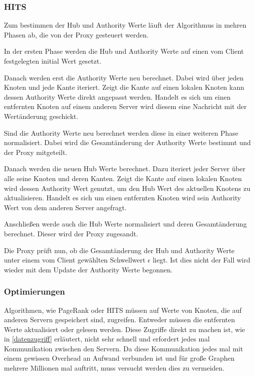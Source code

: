 \subsubsection{HITS}

Zum bestimmen der Hub und Authority Werte läuft der Algorithmus in mehren Phasen ab, die von der Proxy gesteuert werden.

In der ersten Phase werden die Hub und Authority Werte auf einen vom Client festgelegten initial Wert gesetzt.

Danach werden erst die Authority Werte neu berechnet. Dabei wird über jeden Knoten und jede Kante iteriert. Zeigt die Kante auf einen lokalen Knoten kann dessen Authority Werte direkt angepasst werden. Handelt es sich um einen entfernten Knoten auf einem anderen Server
wird diesem eine Nachricht mit der Wertänderung geschickt.

Sind die Authority Werte neu berechnet werden diese in einer weiteren Phase normalisiert. Dabei wird die Gesamtänderung der Authority Werte bestimmt und der Proxy mitgeteilt.

Danach werden die neuen Hub Werte berechnet. Dazu iteriert jeder Server über alle seine Knoten und deren Kanten. Zeigt die Kante auf einen lokalen Knoten wird dessen Authority Wert genutzt, um den Hub Wert des aktuellen Knotens zu aktualisieren.
Handelt es sich um einen entfernten Knoten wird sein Authority Wert von dem anderen Server angefragt. 

Anschließen werde auch die Hub Werte normalisiert und deren Gesamtänderung berechnet. Dieser wird der Proxy zugesandt.

Die Proxy prüft nun, ob die Gesamtänderung der Hub und Authority Werte unter einem vom Client gewählten Schwellwert $\epsilon$ liegt. Ist dies nicht der Fall wird wieder mit dem Update der Authority Werte begonnen.


\subsubsection{Optimierungen}

Algorithmen, wie PageRank oder HITS müssen auf Werte von Knoten, die auf anderen Servern gespeichert sind, zugreifen.
Entweder müssen die entfernten Werte aktualisiert oder gelesen werden. Diese Zugriffe direkt zu machen ist, wie in \ref{datenzugriff} erläutert, nicht sehr schnell und erfordert jedes mal Kommunikation zwischen den Servern.
Da diese Kommunikation jedes mal mit einem gewissen Overhead an Aufwand verbunden ist und für große Graphen mehrere Millionen mal auftritt, muss versucht werden dies zu vermeiden.

